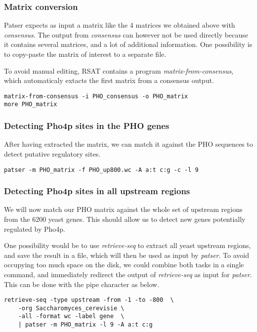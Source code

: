 \subsubsection{Matrix conversion}

Patser expects as input a matrix like the 4 matrices we obtained above
with \textit{consensus}. The output from \textit{consensus} can however
not be used directly because it contains several matrices, and a lot
of additional information. One possibility is to copy-paste the matrix
of interest to a separate file.

To avoid manual editing, RSAT contains a program
\textit{matrix-from-consensus}, which automaticaly extacts the first
matrix from a consensus output.

\begin{verbatim}
matrix-from-consensus -i PHO_consensus -o PHO_matrix
more PHO_matrix
\end{verbatim}


\subsubsection{Detecting Pho4p sites in the PHO genes}

After having extracted the matrix, we can match it against the PHO
sequences to detect putative regulatory sites.

\begin{verbatim}
patser -m PHO_matrix -f PHO_up800.wc -A a:t c:g -c -l 9
\end{verbatim}

\subsubsection{Detecting Pho4p sites in all upstream regions}

We will now match our PHO matrix against the whole set of upstream
regions from the 6200 yeast genes. This should allow us to detect new
genes potentially regulated by Pho4p.

One possibility would be to use \textit{retrieve-seq} to extract all
yeast upstream regions, and save the result in a file, which will then
be used as input by \textit{patser}. To avoid occupying too much space
on the disk, we could combine both tasks in a single command, and
immediately redirect the output of \textit{retrieve-seq} as input for
\textit{patser}. This can be done with the pipe character as below. 


\begin{verbatim}
retrieve-seq -type upstream -from -1 -to -800  \
    -org Saccharomyces_cerevisie \
    -all -format wc -label gene  \
    | patser -m PHO_matrix -l 9 -A a:t c:g
\end{verbatim}
